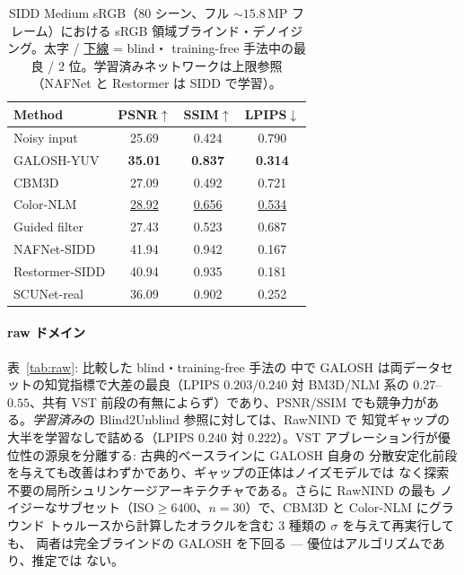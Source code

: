 \documentclass[journal]{IEEEtran}
\begin{document}
\begin{table}[t]
\centering
\caption{SIDD Medium sRGB（80 シーン、フル ${\sim}15.8$\,MP フレーム）における
sRGB 領域ブラインド・デノイジング。太字 / \underline{下線} = blind・
training-free 手法中の最良 / 2 位。学習済みネットワークは上限参照（NAFNet と
Restormer は SIDD で学習）。}
\label{tab:srgb}
\setlength{\tabcolsep}{4pt}
\footnotesize
\begin{tabular}{l ccc}
\toprule
Method & PSNR$\uparrow$ & SSIM$\uparrow$ & LPIPS$\downarrow$\\
\midrule
Noisy input     & 25.69 & 0.424 & 0.790\\
GALOSH-YUV      & \textbf{35.01} & \textbf{0.837} & \textbf{0.314}\\
CBM3D           & 27.09 & 0.492 & 0.721\\
Color-NLM       & \underline{28.92} & \underline{0.656} & \underline{0.534}\\
Guided filter   & 27.43 & 0.523 & 0.687\\
\midrule
NAFNet-SIDD     & 41.94 & 0.942 & 0.167\\
Restormer-SIDD  & 40.94 & 0.935 & 0.181\\
SCUNet-real     & 36.09 & 0.902 & 0.252\\
\bottomrule
\end{tabular}
\end{table}



\paragraph{raw ドメイン} 表~\ref{tab:raw}: 比較した blind・training-free 手法の
中で GALOSH は両データセットの知覚指標で大差の最良（LPIPS $0.203$/$0.240$ 対
BM3D/NLM 系の $0.27$--$0.55$、共有 VST 前段の有無によらず）であり、PSNR/SSIM
でも競争力がある。\emph{学習済み}の Blind2Unblind 参照に対しては、RawNIND で
知覚ギャップの大半を学習なしで詰める（LPIPS $0.240$ 対 $0.222$）。VST
アブレーション行が優位性の源泉を分離する: 古典的ベースラインに GALOSH 自身の
分散安定化前段を与えても改善はわずかであり、ギャップの正体はノイズモデルでは
なく探索不要の局所シュリンケージアーキテクチャである。さらに RawNIND の最も
ノイジーなサブセット（ISO${\geq}6400$、$n{=}30$）で、CBM3D と Color-NLM にグラウンド
トゥルースから計算したオラクルを含む 3 種類の $\sigma$ を与えて再実行しても、
両者は完全ブラインドの GALOSH を下回る --- 優位はアルゴリズムであり、推定では
ない。
\end{document}
